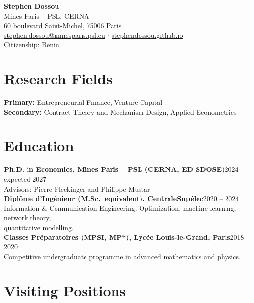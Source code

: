 \documentclass[11pt,a4paper]{article}
\newcommand{\entry}[2]{\textbf{#1}\hfill #2\\}
\begin{document}
\begin{center}
{\LARGE \textbf{Stephen Dossou}}\\[0.5em]
Mines Paris -- PSL, CERNA \\
60 boulevard Saint-Michel, 75006 Paris \\
\href{mailto:stephen.dossou@minesparis.psl.eu}{stephen.dossou@minesparis.psl.eu}
\;$\cdot$\; \href{https://stephendossou.github.io}{stephendossou.github.io}
\\[0.3em]
Citizenship: Benin
\end{center}

\section{Research Fields}

\textbf{Primary:} Entrepreneurial Finance, Venture Capital \\
\textbf{Secondary:} Contract Theory and Mechanism Design, Applied Econometrics

\section{Education}

\entry{Ph.D. in Economics, Mines Paris -- PSL (CERNA, ED SDOSE)}{2024 -- expected 2027}
\hspace{1em} Advisors: Pierre Fleckinger and Philippe Mustar
\\[0.5em]

\entry{Diplôme d'Ingénieur (M.Sc.\ equivalent), CentraleSupélec}{2020 -- 2024}
\hspace{1em} Information \& Communication Engineering. Optimization, machine learning,
network theory, \\
\hspace{1em} quantitative modelling.
\\[0.5em]

\entry{Classes Préparatoires (MPSI, MP*), Lycée Louis-le-Grand, Paris}{2018 -- 2020}
\hspace{1em} Competitive undergraduate programme in advanced mathematics and physics.

\section{Visiting Positions}
\end{document}
